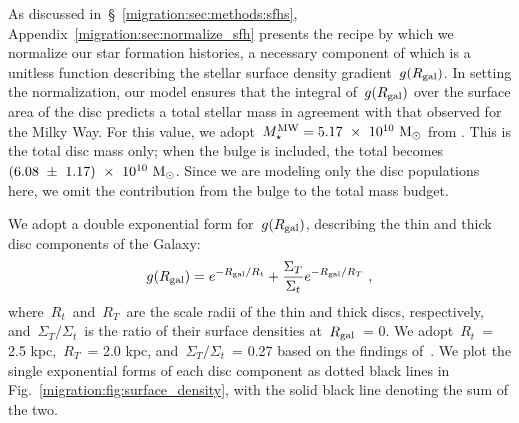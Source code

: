 As discussed in~\S~\ref{migration:sec:methods:sfhs}, Appendix~\ref{migration:sec:normalize_sfh} 
presents the recipe by which we normalize our star formation histories, a 
necessary component of which is a unitless function describing the stellar 
surface density gradient~$g(R_\text{gal})$. 
In setting the normalization, our model ensures that the integral of~$g(R_\text{gal})$ 
over the surface area of the disc predicts a total stellar mass in agreement 
with that observed for the Milky Way. 
For this value, we adopt~$M_\star^\text{MW} = 5.17~\times~10^{10}~\text{M}_\odot$ from 
\citet[][$\pm 1.11\times10^{10}~\msun$]{Licquia2015}. 
This is the total disc mass only; when the bulge is included, the total 
becomes~$(6.08~\pm~1.17)~\times~10^{10}~\text{M}_\odot$. 
Since we are modeling only the disc populations here, we omit the contribution 
from the bulge to the total mass budget. 
\par 
We adopt a double exponential form for~$g(R_\text{gal})$, describing the thin and 
thick disc components of the Galaxy: 
\begin{equation} 
g(R_\text{gal}) = e^{-R_\text{gal}/R_t} + \frac{\Sigma_T}{\Sigma_t} 
e^{-R_\text{gal}/R_T}~, 
\label{migration:eq:gradient} 
\end{equation} 
where~$R_t$~and~$R_T$~are the scale radii of the thin and thick discs, 
respectively, and~$\Sigma_T/\Sigma_t$~is the ratio of their surface densities 
at~$R_\text{gal}$~= 0. 
We adopt~$R_t$~= 2.5 kpc,~$R_T$~= 2.0 kpc, and~$\Sigma_T/\Sigma_t$~= 0.27 based 
on the findings of~\mbox{\citet{Bland-Hawthorn2016}}. 
We plot the single exponential forms of each disc component as dotted black 
lines in Fig.~\ref{migration:fig:surface_density}, with the solid black line denoting the 
sum of the two. 

